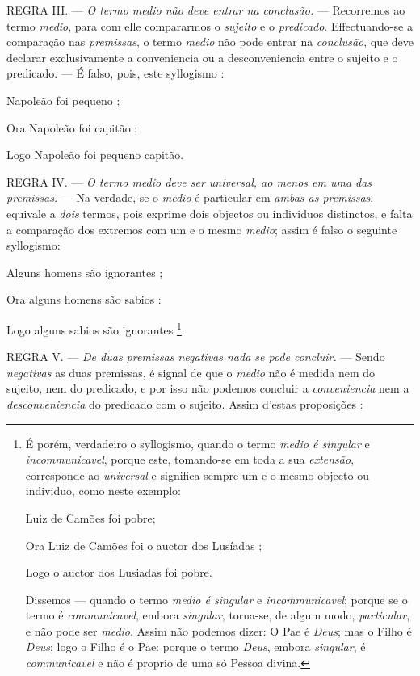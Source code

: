 \textsc{REGRA} III. --- \emph{O termo medio não deve entrar na conclusão.} --- Recorremos ao termo \emph{medio}, para com elle compararmos o \emph{sujeito} e o \emph{predicado}. Effectuando-se a comparação nas \emph{premissas}, o termo \emph{medio} não pode entrar na \emph{conclusão}, que deve declarar exclusivamente a conveniencia ou a desconveniencia entre o sujeito e o predicado. --- É falso, pois, este syllogismo :

Napoleão foi pequeno ;

Ora Napoleão foi capitão ;

Logo Napoleão foi pequeno capitão.

\textsc{REGRA} IV. --- \emph{O termo medio deve ser universal, ao menos em uma das premissas.} --- Na verdade, se o \emph{medio} é particular em \emph{ambas as premissas}, equivale a \emph{dois} termos, pois exprime dois objectos ou individuos distinctos, e falta a comparação dos extremos com um e o mesmo \emph{medio}; assim é falso o seguinte syllogismo:

Alguns homens são ignorantes ;

Ora alguns homens são sabios :

Logo alguns sabios são ignorantes \footnote{É porém, verdadeiro o syllogismo, quando o termo \emph{medio é singular} e \emph{incommunicavel}, porque este, tomando-se em toda a sua \emph{extensão}, corresponde ao \emph{universal} e significa sempre um e o mesmo objecto ou individuo, como neste exemplo:\par Luiz de Camões foi pobre;\par Ora Luiz de Camões foi o auctor dos Lusíadas ;\par Logo o auctor dos Lusiadas foi pobre.\par Dissemos --- quando o termo \emph{medio é singular} e \emph{incommunicavel}; porque se o termo é \emph{communicavel}, embora \emph{singular}, torna-se, de algum modo, \emph{particular}, e não pode ser \emph{medio}. Assim não podemos dizer: O Pae é \emph{Deus}; mas o Filho é \emph{Deus}; logo o Filho é o Pae: porque o termo \emph{Deus}, embora \emph{singular}, é \emph{communicavel} e não é proprio de uma só Pessoa divina.}.

\textsc{REGRA} V. --- \emph{De duas premissas negativas nada se pode concluir.} --- Sendo \emph{negativas} as duas premissas, é signal de que o \emph{medio} não é medida nem do sujeito, nem do predicado, e por isso não podemos concluir a \emph{conveniencia} nem a \emph{desconveniencia} do predicado com o sujeito. Assim d'estas proposições :


